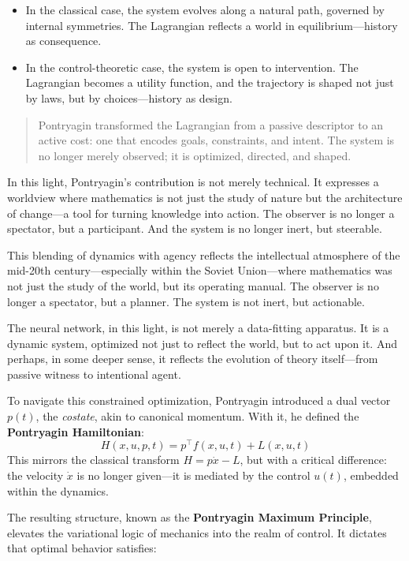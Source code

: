 \begin{itemize}
  \item In the classical case, the system evolves along a natural path, governed by internal symmetries. The Lagrangian reflects a world in equilibrium—history as consequence.
  \item In the control-theoretic case, the system is open to intervention. The Lagrangian becomes a utility function, and the trajectory is shaped not just by laws, but by choices—history as design.
\end{itemize}

\begin{quote}
Pontryagin transformed the Lagrangian from a passive descriptor to an active cost: one that encodes goals, constraints, and intent. The system is no longer merely observed; it is optimized, directed, and shaped.
\end{quote}

In this light, Pontryagin’s contribution is not merely technical. It expresses a worldview where mathematics is not just the study of nature but the architecture of change—a tool for turning knowledge into action. The observer is no longer a spectator, but a participant. And the system is no longer inert, but steerable.


This blending of dynamics with agency reflects the intellectual atmosphere of the mid-20th century—especially within the Soviet Union—where mathematics was not just the study of the world, but its operating manual. The observer is no longer a spectator, but a planner. The system is not inert, but actionable.

The neural network, in this light, is not merely a data-fitting apparatus. It is a dynamic system, optimized not just to reflect the world, but to act upon it. And perhaps, in some deeper sense, it reflects the evolution of theory itself—from passive witness to intentional agent.

To navigate this constrained optimization, Pontryagin introduced a dual vector \( p(t) \), the \emph{costate}, akin to canonical momentum. With it, he defined the \textbf{Pontryagin Hamiltonian}:
\[
H(x, u, p, t) = p^\top f(x, u, t) + L(x, u, t)
\]
This mirrors the classical transform \( H = p \dot{x} - L \), but with a critical difference: the velocity \( \dot{x} \) is no longer given—it is mediated by the control \( u(t) \), embedded within the dynamics.

The resulting structure, known as the \textbf{Pontryagin Maximum Principle}, elevates the variational logic of mechanics into the realm of control. It dictates that optimal behavior satisfies:

